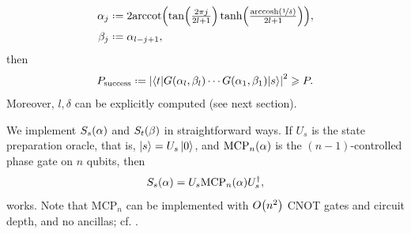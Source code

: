 \documentclass[reqno,10pt]{amsart}
\numberwithin{equation}{section}                %
\let\originalleft\left
\let\originalright\right
\renewcommand{\left}{\mathopen{}\mathclose\bgroup\originalleft}
\renewcommand{\right}{\aftergroup\egroup\originalright}
\def\({\mathopen{}\left(}
\def\){\right)\mathclose{}}
\newcommand*{\eqdef}{\mathrel{\vcenter{\baselineskip0.5ex \lineskiplimit0pt\hbox{.}\hbox{.}}}=}
\begin{document}
\begin{align}
   \alpha_j &\eqdef 2 \mathrm{arccot} \( \tan \( \tfrac{2 \pi j}{2 l + 1} \) \tanh \( \tfrac{\mathrm{arccosh} \( \nicefrac{1}{\delta} \)}{2 l + 1} \) \), \\
   \beta_j  &\eqdef \alpha_{l - j + 1},
\end{align}
then
\begin{equation}
   P_{\mathrm{success}} \eqdef \left| \left\langle t \middle| G \( \alpha_l, \beta_l \) \cdots G \( \alpha_1, \beta_1 \) \middle| s \right\rangle \right|^2 \geqslant P.
\end{equation}
Moreover, $l, \delta$ can be explicitly computed (see next section).

\smallskip

We implement $S_s \( \alpha \)$ and $S_t \( \beta \)$ in straightforward ways. If $U_s$ is the state preparation oracle, that is, $\ket{s} = U_s \ket{0}$, and $\mathrm{MCP}_n \( \alpha \)$ is the $(n - 1)$-controlled phase gate on $n$ qubits, then
\begin{equation}
   S_s \( \alpha \) = U_s \mathrm{MCP}_n \( \alpha \) U_s^\dagger, \label{eq:diffuser}
\end{equation}
works. Note that $\mathrm{MCP}_n$ can be implemented with $O \( n^2 \)$ CNOT gates and circuit depth, and no ancillas; cf. \cite{linear_dasilva_2022}.
\end{document}
